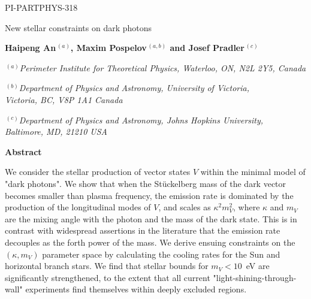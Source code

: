 \documentclass[12pt]{article}
\begin{document}
\begin{titlepage}
 
\begin{flushright}
\normalsize{PI-PARTPHYS-318}
\end{flushright}

\setcounter{page}{1}

\vspace*{0.2in}

\begin{center}

\hspace*{-0.6cm}\parbox{17.5cm}{\Large \bf \begin{center}
New stellar constraints on dark photons
\end{center}}

\vspace*{0.5cm}
\normalsize

\vspace*{0.5cm}
\normalsize


{\bf Haipeng An$^{\,(a)}$, Maxim Pospelov$^{\,(a,b)}$ and Josef Pradler$^{\,(c)}$}

\smallskip
\medskip

$^{\,(a)}${\it Perimeter Institute for Theoretical Physics, Waterloo,
ON, N2L 2Y5, Canada}

$^{\,(b)}${\it Department of Physics and Astronomy, University of Victoria, \\
  Victoria, BC, V8P 1A1 Canada}

$^{\,(c)}${\it Department of Physics and Astronomy, Johns Hopkins University, \\
  Baltimore, MD, 21210 USA}

\smallskip
\end{center}
\vskip0.2in


\centerline{\large\bf Abstract}

We consider the stellar production of vector states $V$ within the
minimal model of "dark photons".  We show that when the St\"uckelberg
mass of the dark vector becomes smaller than plasma frequency, the
emission rate is dominated by the production of the longitudinal modes
of $V$, and scales as $\kappa^2 m_V^2$, where $\kappa$ and $m_V$ are
the mixing angle with the photon and the mass of the dark state. This
is in contrast with  widespread assertions in the literature that
the emission rate decouples as the forth power of the mass. We derive
ensuing constraints on the $(\kappa, m_V)$ parameter space by calculating
the cooling rates for the Sun and horizontal branch stars.  We find that
stellar bounds for $m_V < 10$~eV are significantly strengthened, to
the extent that all current "light-shining-through-wall" experiments
find themselves within deeply excluded regions.



\vfil

    
\end{titlepage}
\end{document}
